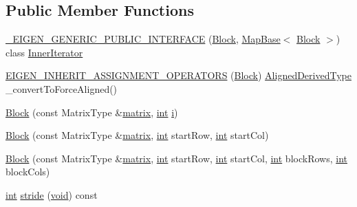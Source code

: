 \subsection*{Public Member Functions}
\begin{DoxyCompactItemize}
\item 
\hyperlink{class_block_3_01_matrix_type_00_01_block_rows_00_01_block_cols_00_01_packet_access_00_01_has_direct_access_01_4_a6d3476ae8f836f4ebe35996d52b72637}{\-\_\-\-E\-I\-G\-E\-N\-\_\-\-G\-E\-N\-E\-R\-I\-C\-\_\-\-P\-U\-B\-L\-I\-C\-\_\-\-I\-N\-T\-E\-R\-F\-A\-C\-E} (\hyperlink{class_block}{Block}, \hyperlink{class_map_base}{Map\-Base}$<$ \hyperlink{class_block}{Block} $>$) class \hyperlink{class_inner_iterator}{Inner\-Iterator}
\item 
\hyperlink{class_block_3_01_matrix_type_00_01_block_rows_00_01_block_cols_00_01_packet_access_00_01_has_direct_access_01_4_ac2e1d5579bbc1e665c8160e9e095d621}{E\-I\-G\-E\-N\-\_\-\-I\-N\-H\-E\-R\-I\-T\-\_\-\-A\-S\-S\-I\-G\-N\-M\-E\-N\-T\-\_\-\-O\-P\-E\-R\-A\-T\-O\-R\-S} (\hyperlink{class_block}{Block}) \hyperlink{class_block_3_01_matrix_type_00_01_block_rows_00_01_block_cols_00_01_packet_access_00_01_has_direct_access_01_4_ab969a64c6878b5d4ecfae626e7e2e8d2}{Aligned\-Derived\-Type} \-\_\-convert\-To\-Force\-Aligned()
\item 
\hyperlink{class_block_3_01_matrix_type_00_01_block_rows_00_01_block_cols_00_01_packet_access_00_01_has_direct_access_01_4_abaa28f549d77c51de2ec7593926c6f92}{Block} (const Matrix\-Type \&\hyperlink{glext_8h_a7b24a3f2f56eb1244ae69dacb4fecb6f}{matrix}, \hyperlink{ioapi_8h_a787fa3cf048117ba7123753c1e74fcd6}{int} \hyperlink{uavobjecttemplate_8m_a6f6ccfcf58b31cb6412107d9d5281426}{i})
\item 
\hyperlink{class_block_3_01_matrix_type_00_01_block_rows_00_01_block_cols_00_01_packet_access_00_01_has_direct_access_01_4_a3c54340f73d535ebda3190c021255691}{Block} (const Matrix\-Type \&\hyperlink{glext_8h_a7b24a3f2f56eb1244ae69dacb4fecb6f}{matrix}, \hyperlink{ioapi_8h_a787fa3cf048117ba7123753c1e74fcd6}{int} start\-Row, \hyperlink{ioapi_8h_a787fa3cf048117ba7123753c1e74fcd6}{int} start\-Col)
\item 
\hyperlink{class_block_3_01_matrix_type_00_01_block_rows_00_01_block_cols_00_01_packet_access_00_01_has_direct_access_01_4_aca63bc612c63b7569fa47b3ecca523ce}{Block} (const Matrix\-Type \&\hyperlink{glext_8h_a7b24a3f2f56eb1244ae69dacb4fecb6f}{matrix}, \hyperlink{ioapi_8h_a787fa3cf048117ba7123753c1e74fcd6}{int} start\-Row, \hyperlink{ioapi_8h_a787fa3cf048117ba7123753c1e74fcd6}{int} start\-Col, \hyperlink{ioapi_8h_a787fa3cf048117ba7123753c1e74fcd6}{int} block\-Rows, \hyperlink{ioapi_8h_a787fa3cf048117ba7123753c1e74fcd6}{int} block\-Cols)
\item 
\hyperlink{ioapi_8h_a787fa3cf048117ba7123753c1e74fcd6}{int} \hyperlink{class_block_3_01_matrix_type_00_01_block_rows_00_01_block_cols_00_01_packet_access_00_01_has_direct_access_01_4_aeaa97f02090ec46ce53298120e31d05d}{stride} (\hyperlink{group___u_a_v_objects_plugin_ga444cf2ff3f0ecbe028adce838d373f5c}{void}) const 
\end{DoxyCompactItemize}
